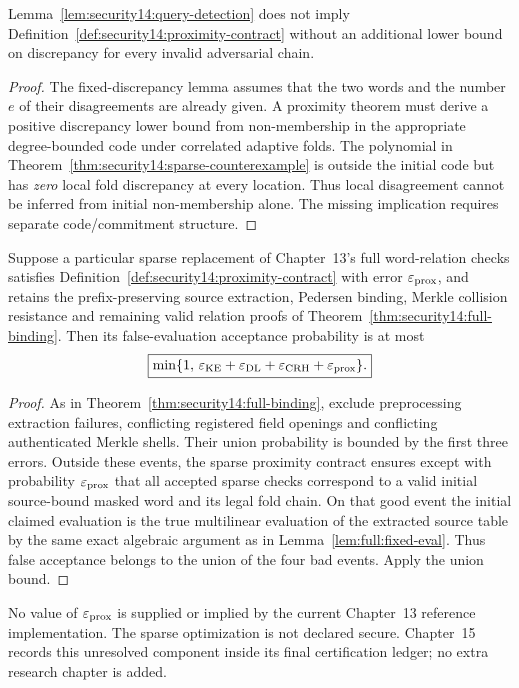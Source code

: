 \begin{proposition}\label{prop:security14:not-proximity}
Lemma~\ref{lem:security14:query-detection}
does not imply
Definition~\ref{def:security14:proximity-contract}
without an additional
lower bound on discrepancy
for every invalid adversarial
chain.
\end{proposition}
\begin{proof}
The fixed-discrepancy
lemma assumes that the
two words and the number
$e$ of their disagreements
are already given.
A proximity theorem must
derive a positive
discrepancy lower bound
from non-membership
in the appropriate
degree-bounded code
under correlated adaptive
folds. The polynomial
in
Theorem~\ref{thm:security14:sparse-counterexample}
is outside the initial
code but has \emph{zero}
local fold discrepancy
at every location.
Thus local disagreement
cannot be inferred from
initial non-membership
alone. The missing
implication requires
separate code/commitment
structure.
\end{proof}

\begin{theorem}\label{thm:security14:sparse-sound}
Suppose a particular
sparse replacement of
Chapter~13's full
word-relation checks
satisfies
Definition~\ref{def:security14:proximity-contract}
with error
$\varepsilon_{\rm prox}$,
and retains the
prefix-preserving source
extraction, Pedersen binding,
Merkle collision resistance
and remaining valid
relation proofs of
Theorem~\ref{thm:security14:full-binding}.
Then its false-evaluation
acceptance probability is
at most
\[
 \boxed{\min\{1,\,
 \varepsilon_{\rm KE}
 +\varepsilon_{\rm DL}
 +\varepsilon_{\rm CRH}
 +\varepsilon_{\rm prox}\}.}
\]
\end{theorem}
\begin{proof}
As in
Theorem~\ref{thm:security14:full-binding},
exclude preprocessing
extraction failures,
conflicting registered
field openings and
conflicting authenticated
Merkle shells.
Their union probability
is bounded by the first
three errors. Outside
these events, the sparse
proximity contract ensures
except with probability
$\varepsilon_{\rm prox}$
that all accepted sparse
checks correspond to a
valid initial source-bound
masked word and its legal
fold chain. On that good
event the initial claimed
evaluation is the true
multilinear evaluation
of the extracted source
table by the same
exact algebraic argument
as in
Lemma~\ref{lem:full:fixed-eval}.
Thus false acceptance
belongs to the union
of the four bad events.
Apply the union bound.
\end{proof}

\begin{remark}
No value of
$\varepsilon_{\rm prox}$
is supplied or implied
by the current Chapter~13
reference implementation.
The sparse optimization
is not declared secure.
Chapter~15 records this
unresolved component
inside its final
certification ledger;
no extra research
chapter is added.
\end{remark}
